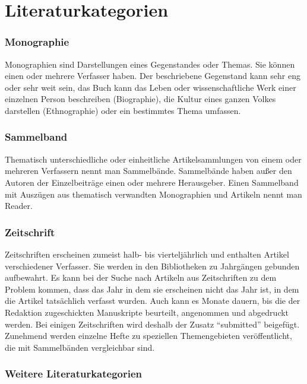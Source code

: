 \documentclass[ 12pt,
                titlepage,
                parskip=half,
                version=first,
                bibliography=totocnumbered,
                final,
                listof=totoc]{scrartcl}
\begin{document}
\newpage
{}
\tableofcontents
{}
\newpage

\section{Literaturkategorien}
\label{sec:literaturkategorien}

\subsubsection*{Monographie}

Monographien sind Darstellungen eines Gegenstandes oder Themas. Sie können einen
oder mehrere Verfasser haben. Der beschriebene Gegenstand kann sehr eng oder
sehr weit sein, das Buch kann das Leben oder wissenschaftliche Werk einer
einzelnen Person beschreiben (Biographie), die Kultur eines ganzen Volkes
darstellen (Ethnographie) oder ein bestimmtes Thema umfassen.

\subsubsection*{Sammelband}

Thematisch unterschiedliche oder einheitliche Artikelsammlungen von einem oder
mehreren Verfassern nennt man Sammelbände. Sammelbände haben außer den Autoren
der Einzelbeiträge einen oder mehrere Herausgeber. Einen Sammelband mit Auszügen
aus thematisch verwandten Monographien und Artikeln nennt man Reader.

\subsubsection*{Zeitschrift}

Zeitschriften erscheinen zumeist halb- bis vierteljährlich und enthalten Artikel
verschiedener Verfasser. Sie werden in den Bibliotheken zu Jahrgängen gebunden
aufbewahrt. Es kann bei der Suche nach Artikeln aus Zeitschriften zu dem Problem
kommen, dass das Jahr in dem sie erscheinen nicht das Jahr ist, in dem die
Artikel tatsächlich verfasst wurden. Auch kann es Monate dauern, bis die der
Redaktion zugeschickten Manuskripte beurteilt, angenommen und abgedruckt werden.
Bei einigen Zeitschriften wird deshalb der Zusatz \enquote{submitted} beigefügt.
Zunehmend werden einzelne Hefte zu speziellen Themengebieten veröffentlicht, die
mit Sammelbänden vergleichbar sind.

\subsubsection*{Weitere Literaturkategorien}
\end{document}
